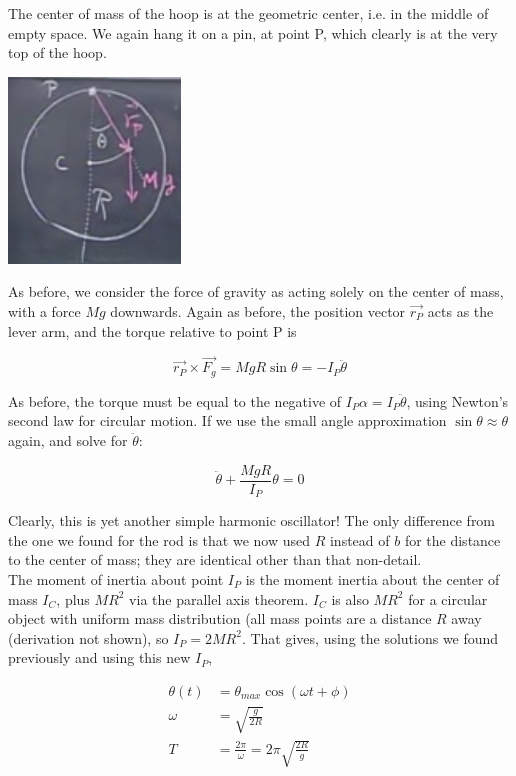 \documentclass[8.01x]{subfiles}
\begin{document}
The center of mass of the hoop is at the geometric center, i.e. in the middle of empty space. We again hang it on a pin, at point P, which clearly is at the very top of the hoop.

\begin{center}
\includegraphics[scale=0.7]{Graphics/lec21_hoop_pendulum}
\end{center}

As before, we consider the force of gravity as acting solely on the center of mass, with a force $M g$ downwards. Again as before, the position vector $\vec{r_P}$ acts as the lever arm, and the torque relative to point P is

\begin{equation}
\vec{r_P} \times \vec{F_g} = M g R \sin \theta = -I_P \ddot{\theta}
\end{equation}

As before, the torque must be equal to the negative of $I_P \alpha = I_P \ddot{\theta}$, using Newton's second law for circular motion. If we use the small angle approximation $\sin \theta \approx \theta$ again, and solve for $\ddot{\theta}$:

\begin{equation}
\ddot{\theta} + \frac{M g R}{I_P} \theta = 0
\end{equation}

Clearly, this is yet another simple harmonic oscillator! The only difference from the one we found for the rod is that we now used $R$ instead of $b$ for the distance to the center of mass; they are identical other than that non-detail.\\
The moment of inertia about point $I_P$ is the moment inertia about the center of mass $I_C$, plus $M R^2$ via the parallel axis theorem. $I_C$ is also $M R^2$ for a circular object with uniform mass distribution (all mass points are a distance $R$ away (derivation not shown), so $I_P = 2 M R^2$. That gives, using the solutions we found previously and using this new $I_P$,

\begin{align}
\theta(t) &= \theta_{max} \cos(\omega t + \phi)\\
\omega    &= \sqrt{\frac{g}{2 R}}\\
T         &= \frac{2 \pi}{\omega} = 2 \pi \sqrt{\frac{2 R}{g}}
\end{align}
\end{document}
